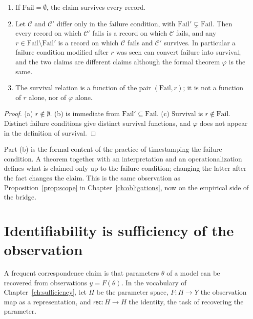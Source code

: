 \begin{proposition}
\label{prop:fail-content}
\begin{enumerate}[label=(\alph*),nosep]
\item If $\mathrm{Fail}=\emptyset$, the claim survives every record.
\item Let $\mathcal C$ and $\mathcal C'$ differ only in the failure condition, with $\mathrm{Fail}'\subsetneq\mathrm{Fail}$. Then every record on which $\mathcal C'$ fails is a record on which $\mathcal C$ fails, and any $r\in\mathrm{Fail}\setminus\mathrm{Fail}'$ is a record on which $\mathcal C$ fails and $\mathcal C'$ survives. In particular a failure condition modified after $r$ was seen can convert failure into survival, and the two claims are different claims although the formal theorem $\varphi$ is the same.
\item The survival relation is a function of the pair $(\mathrm{Fail},r)$; it is not a function of $r$ alone, nor of $\varphi$ alone.
\end{enumerate}
\end{proposition}

\begin{proof}
(a) $r\notin\emptyset$. (b) is immediate from $\mathrm{Fail}'\subseteq\mathrm{Fail}$. (c) Survival is $r\notin\mathrm{Fail}$. Distinct failure conditions give distinct survival functions, and $\varphi$ does not appear in the definition of survival.
\end{proof}

Part (b) is the formal content of the practice of timestamping the failure condition. A theorem together with an interpretation and an operationalization defines what is claimed only up to the failure condition; changing the latter after the fact changes the claim. This is the same observation as Proposition~\ref{prop:scope} in Chapter~\ref{ch:obligations}, now on the empirical side of the bridge.

\section{Identifiability is sufficiency of the observation}
\label{sec:ident}

A frequent correspondence claim is that parameters $\theta$ of a model can be recovered from observations $y=F(\theta)$. In the vocabulary of Chapter~\ref{ch:sufficiency}, let $H$ be the parameter space, $F:H\to Y$ the observation map as a representation, and $\mathsf{rec}:H\to H$ the identity, the task of recovering the parameter.

